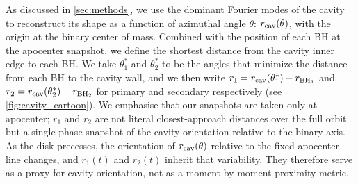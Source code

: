 \documentclass[fleqn,usenatbib]{mnras}
\begin{document}
As discussed in \autoref{sec:methods}, we use the dominant Fourier modes of the cavity to reconstruct its shape as a function of azimuthal angle $\theta$: $r_{\rm cav}(\theta)$, with the origin at the binary center of mass. Combined with the position of each BH at the apocenter snapshot, we define the shortest distance from the cavity inner edge to each BH. We take $\theta_1^*$ and $\theta_2^*$ to be the angles that minimize the distance from each BH to the cavity wall, and we then write $r_1 = r_{\rm cav}(\theta_1^*) - r_{\rm BH_1}$ and $r_2 = r_{\rm cav}(\theta_2^*) - r_{\rm BH_2}$ for primary and secondary respectively (see \autoref{fig:cavity_cartoon}). We emphasise that our snapshots are taken only at apocenter; $r_1$ and $r_2$ are not literal closest-approach distances over the full orbit but a single-phase snapshot of the cavity orientation relative to the binary axis. As the disk precesses, the orientation of $r_{\rm cav}(\theta)$ relative to the fixed apocenter line changes, and $r_1(t)$ and $r_2(t)$ inherit that variability. They therefore serve as a proxy for cavity orientation, not as a moment-by-moment proximity metric.
\end{document}
